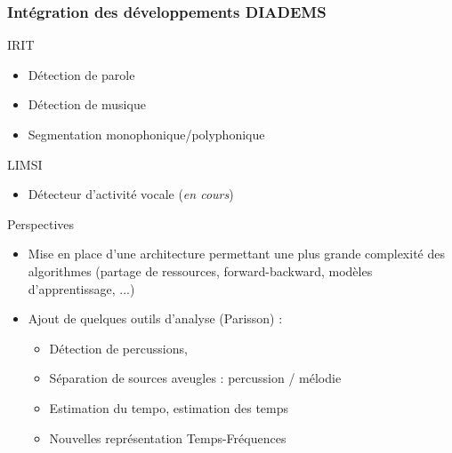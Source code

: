 \documentclass[10pt, final, hyperref, table]{beamer}
\begin{document}
\begin{frame}
  \frametitle{Intégration des développements DIADEMS}
  \begin{block}{IRIT}
    \begin{itemize}
    \item Détection de parole
    \item Détection de musique 
    \item Segmentation monophonique/polyphonique 
    \end{itemize}
  \end{block}
  \begin{block}{LIMSI}
    \begin{itemize}
    \item Détecteur d'activité vocale (\emph{en cours})
    \end{itemize}
  \end{block}
  \begin{block}{Perspectives}
    \begin{itemize}
    \item Mise en place d'une architecture permettant une plus grande complexité des algorithmes (partage de ressources, forward-backward, modèles d'apprentissage, ...)
    \item Ajout de quelques outils d'analyse (Parisson) :
      \begin{itemize}
      \item Détection de percussions,
      \item Séparation de sources aveugles : percussion / mélodie
      \item Estimation du tempo, estimation des temps
      \item Nouvelles représentation Temps-Fréquences 
      \end{itemize}

    \end{itemize}
    
  \end{block}
\end{frame}
\end{document}

